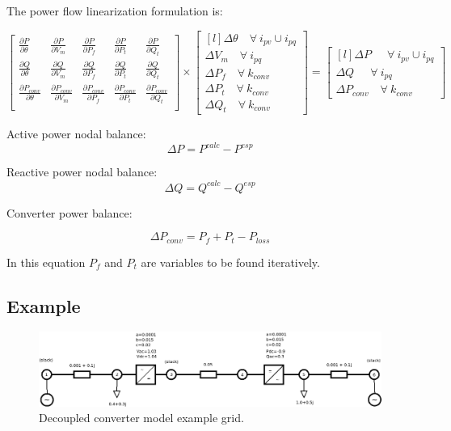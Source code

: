 \documentclass[11pt]{article}
\begin{document}
	The power flow linearization formulation is:
	
	\begin{equation}
		\begin{bmatrix}
			\frac{\partial P}{\partial \theta} & \frac{\partial P}{\partial V_m} & \frac{\partial P}{\partial P_f} & \frac{\partial P}{\partial P_t} & \frac{\partial P}{\partial Q_t}\\
			\frac{\partial Q}{\partial \theta} & \frac{\partial Q}{\partial V_m} & \frac{\partial Q}{\partial P_f} & \frac{\partial Q}{\partial P_t} & \frac{\partial Q}{\partial Q_t}\\
			\frac{\partial P_{conv}}{\partial \theta} & \frac{\partial P_{conv}}{\partial V_m} & \frac{\partial P_{conv}}{\partial P_f} & \frac{\partial P_{conv}}{\partial P_t} & \frac{\partial P_{conv}}{\partial Q_t}\\
		\end{bmatrix}	
		\times 
		\begin{bmatrix*}[l]
			\Delta \theta  \quad \forall \ i_{pv} \cup i_{pq}   \\
			\Delta V_m     \quad \forall \ i_{pq}  \\
			\Delta P_f     \quad \forall \ k_{conv} \\
			\Delta P_t     \quad \forall \ k_{conv} \\
			\Delta Q_t     \quad \forall \ k_{conv}
		\end{bmatrix*}
		= 
		\begin{bmatrix*}[l]
			\Delta P \quad \ \ \forall \ i_{pv} \cup i_{pq} \\
			\Delta Q \quad \ \ \forall \ i_{pq}  \\
			\Delta P_{conv} \quad \forall \ k_{conv} 
		\end{bmatrix*}
	\end{equation}
	
	
	Active power nodal balance:
	\begin{equation}
		\Delta P = P^{calc} - P^{esp}
	\end{equation}
	
	
	Reactive power nodal balance:
	\begin{equation}
		\Delta Q = Q^{calc} - Q^{esp}
	\end{equation}
	
	

		
	Converter power balance:
	
	\begin{equation}
		\Delta P_{conv} = P_f + P_t - P_{loss}
	\end{equation}
	
	In this equation $P_f$ and $P_t$ are variables to be found iteratively.
	
	
	\subsection{Example}
		
	
	
	\begin{figure}[h!]
		\centering
		\includegraphics[width=1.0\linewidth]{acdc_6bus_diagram}
		\caption{Decoupled converter model example grid.}
		\label{fig:acdc6busdiagram}
	\end{figure}
\end{document}
